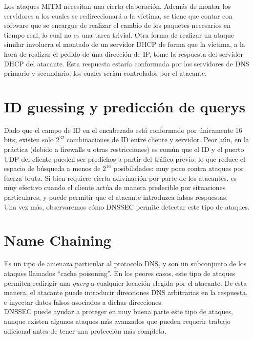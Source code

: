 Los ataques MITM necesitan una cierta elaboraci\'on. Adem\'as de montar los servidores a los cuales se redireccionar\'a a la v\'ictima, se tiene que contar con software que se encargue de realizar el cambio de los paquetes necesarios en tiempo real, lo cual no es una tarea trivial. Otra forma de realizar un ataque similar involucra el montado de un servidor DHCP de forma que la v\'ictima, a la hora de realizar el pedido de una direcci\'on de IP, tome la respuesta del servidor DHCP del atacante. Esta respuesta estar\'ia conformada por los servidores de DNS primario y secundario, los cuales ser\'ian controlados por el atacante.


\section{ID guessing y predicci\'on de querys}

Dado que el campo de ID en el encabezado est\'a conformado por \'unicamente 16 bits, existen solo $2^{32}$ combinaciones de ID entre cliente y servidor. Peor a\'un, en la pr\'actica (debido a firewalls u otras restricciones) es com\'un que el ID y el puerto UDP del cliente pueden ser predichos a partir del tr\'afico previo, lo que reduce el espacio de b\'usqueda a menos de $2^{16}$ posibilidades: muy poco contra ataques por fuerza bruta. Si bien requiere cierta adivinaci\'on por parte de los atacantes, es muy efectivo cuando el cliente act\'ua de manera predecible por situaciones particulares, y puede permitir que el atacante introduzca falsas respuestas.\\
Una vez m\'as, observaremos c\'omo DNSSEC permite detectar este tipo de ataques.

\section{Name Chaining}

Es un tipo de amenaza particular al protocolo DNS, y son un subconjunto de los ataques llamados ``cache poisoning''. En los peores casos, este tipo de ataques permiten redirigir una \textit{query} a cualquier locaci\'on elegida por el atacante. De esta manera, el atacante puede introducir direcciones DNS arbitrarias en la respuesta, e inyectar datos falsos asociados a dichas direcciones.\\
DNSSEC puede ayudar a proteger en muy buena parte este tipo de ataques, aunque existen algunos ataques m\'as avanzados que pueden requerir trabajo adicional antes de tener una protecci\'on m\'as completa.

